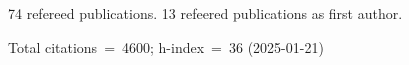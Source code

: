 74 refereed publications. 13 refeered publications as first author.

Total citations~=~4600; h-index~=~36 (2025-01-21)